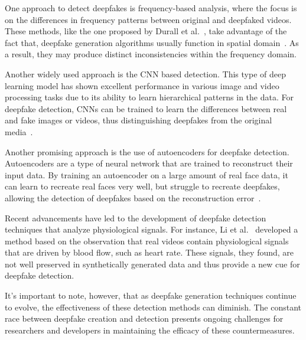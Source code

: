 One approach to detect deepfakes is frequency-based analysis, where the focus is
on the differences in frequency patterns between original and deepfaked videos.
These methods, like the one proposed by Durall et al.~\cite{durall2020unmasking},
take advantage of the fact that, deepfake generation algorithms usually function in
spatial domain~\cite{spatial-domain}. As a result, they may produce distinct inconsistencies
within the frequency domain.

Another widely used approach is the \ac{CNN} based detection. This type of deep
learning model has shown excellent performance in various image and video
processing tasks due to its ability to learn hierarchical patterns in the data.
For deepfake detection, \ac{CNN}s can be trained to learn the differences between
real and fake images or videos, thus distinguishing deepfakes from the original
media~\cite{nguyen2018capsuleforensics}.

Another promising approach is the use of autoencoders for deepfake detection.
Autoencoders are a type of neural network that are trained to reconstruct
their input data. By training an autoencoder on a large amount of real face
data, it can learn to recreate real faces very well, but struggle to recreate
deepfakes, allowing the detection of deepfakes based on the reconstruction
error~\cite{cozzolino2017recasting}.

Recent advancements have led to the development of deepfake detection techniques
that analyze physiological signals. For instance, Li et al.~\cite{li2018ictu}
developed a method based on the observation that real videos contain physiological
signals that are driven by blood flow, such as heart rate. These signals, they
found, are not well preserved in synthetically generated data and thus provide
a new cue for deepfake detection.

It's important to note, however, that as deepfake generation techniques
continue to evolve, the effectiveness of these detection methods can diminish.
The constant race between deepfake creation and detection presents ongoing
challenges for researchers and developers in maintaining the efficacy of these
countermeasures.